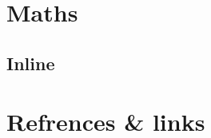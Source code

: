 \documentclass{article}
\begin{document}
	\section{}
	\subsection{}
	\subsection{}
	\subsection{}
	\newpage
	
	\section{Maths}
	\subsection{Inline}
	\subsection{}
	\subsection{}
	\newpage

	\section{Refrences \& links}
	\subsection{}
	\subsection{}
	\subsection{}
	\newpage
\end{document}

